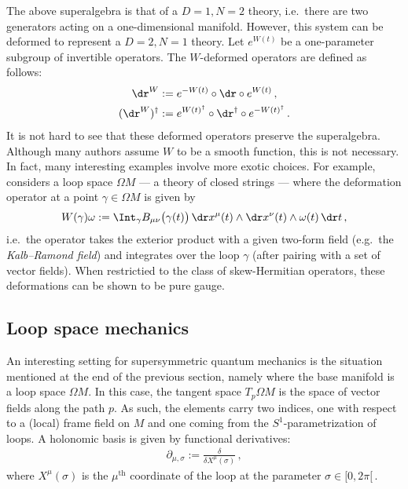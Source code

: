     The above superalgebra is that of a $D=1,N=2$ theory, i.e.~there are two generators acting on a one-dimensional manifold. However, this system can be deformed to represent a $D=2,N=1$ theory. Let $e^{W(t)}$ be a one-parameter subgroup of invertible operators. The $W$-deformed operators are defined as follows:
    \begin{align}
        \dr^W &:= e^{-W(t)}\circ\dr\circ e^{W(t)}\,,\\
        (\dr^W)^\dagger &:= e^{W(t)^\dagger}\circ\dr^\dagger\circ e^{-W(t)^\dagger}\,.
    \end{align}
    It is not hard to see that these deformed operators preserve the superalgebra. Although many authors assume $W$ to be a smooth function, this is not necessary. In fact, many interesting examples involve more exotic choices. For example, \citet{schreiber_loop_2005} considers a loop space $\Omega M$ --- a theory of closed strings --- where the deformation operator at a point $\gamma\in\Omega M$ is given by
    \begin{gather}
        W(\gamma)\omega := \Int_\gamma B_{\mu\nu}\bigl(\gamma(t)\bigr)\,\dr x^\mu(t)\wedge\dr x^\nu(t)\wedge\omega(t)\,\dr t\,,
    \end{gather}
    i.e.~the operator takes the exterior product with a given two-form field (e.g.~the \textit{Kalb--Ramond field}) and integrates over the loop $\gamma$ (after pairing with a set of vector fields). When restrictied to the class of skew-Hermitian operators, these deformations can be shown to be pure gauge.


\subsection{Loop space mechanics}

    An interesting setting for supersymmetric quantum mechanics is the situation mentioned at the end of the previous section, namely where the base manifold is a loop space $\Omega M$. In this case, the tangent space $T_p\Omega M$ is the space of vector fields along the path $p$. As such, the elements carry two indices, one with respect to a (local) frame field on $M$ and one coming from the $S^1$-parametrization of loops. A holonomic basis is given by functional derivatives:
    \begin{gather}
        \partial_{\mu,\sigma} := \frac{\delta}{\delta X^\mu(\sigma)}\,,
    \end{gather}
    where $X^\mu(\sigma)$ is the $\mu^{\text{th}}$ coordinate of the loop at the parameter $\sigma\in[0,2\pi[\,$.

